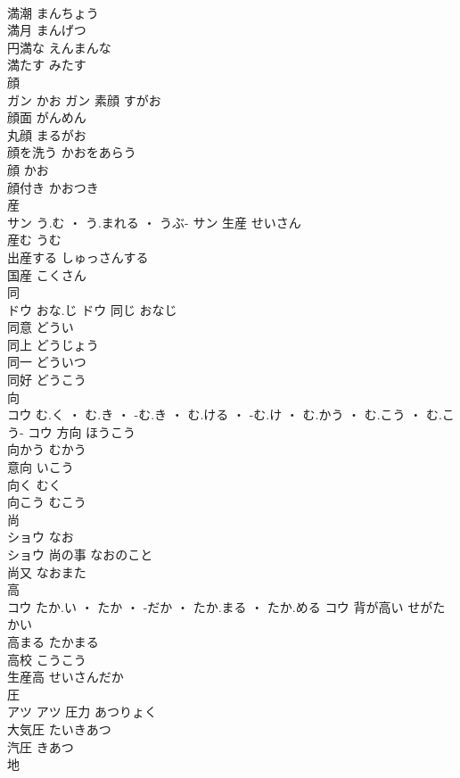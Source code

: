 \documentclass[8pt]{extreport}
\begin{document}
\begin{CJK}{UTF8}{min}
\\	満潮	まんちょう	
\\	満月	まんげつ	
\\	円満な	えんまんな	
\\	満たす	みたす	
\\	顔	
\\	ガン	かお	ガン	素顔	すがお	
\\	顔面	がんめん	
\\	丸顔	まるがお	
\\	顔を洗う	かおをあらう	
\\	顔	かお	
\\	顔付き	かおつき	
\\	産	
\\	サン	う.む ・ う.まれる ・ うぶ-	サン	生産	せいさん	
\\	産む	うむ	
\\	出産する	しゅっさんする	
\\	国産	こくさん	
\\	同	
\\	ドウ	おな.じ	ドウ	同じ	おなじ	
\\	同意	どうい	
\\	同上	どうじょう	
\\	同一	どういつ	
\\	同好	どうこう	
\\	向	
\\	コウ	む.く ・ む.き ・ -む.き ・ む.ける ・ -む.け ・ む.かう ・ む.こう ・ む.こう-	コウ	方向	ほうこう	
\\	向かう	むかう	
\\	意向	いこう	
\\	向く	むく	
\\	向こう	むこう	
\\	尚	
\\	ショウ	なお
\\	ショウ	尚の事	なおのこと	
\\	尚又	なおまた	
\\	高	
\\	コウ	たか.い ・ たか ・ -だか ・ たか.まる ・ たか.める	コウ	背が高い	せがたかい	
\\	高まる	たかまる	
\\	高校	こうこう	
\\	生産高	せいさんだか	
\\	圧	
\\	アツ		アツ	圧力	あつりょく	
\\	大気圧	たいきあつ	
\\	汽圧	きあつ	
\\	地	

\end{CJK}
\end{document}
